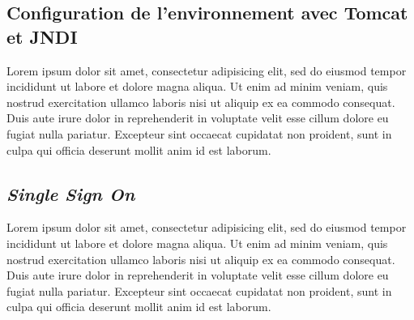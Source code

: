 \documentclass{article}
\begin{document}
\subsection{Configuration de l'environnement avec Tomcat et JNDI} %
\label{sub:deploiement_avec_tomcat}
Lorem ipsum dolor sit amet, consectetur adipisicing elit, sed do eiusmod tempor incididunt ut labore et dolore magna aliqua. Ut enim ad minim veniam, quis nostrud exercitation ullamco laboris nisi ut aliquip ex ea commodo consequat. Duis aute irure dolor in reprehenderit in voluptate velit esse cillum dolore eu fugiat nulla pariatur. Excepteur sint occaecat cupidatat non proident, sunt in culpa qui officia deserunt mollit anim id est laborum.

\subsection{\emph{Single Sign On}} %
\label{sub:single_sign_on}
Lorem ipsum dolor sit amet, consectetur adipisicing elit, sed do eiusmod tempor incididunt ut labore et dolore magna aliqua. Ut enim ad minim veniam, quis nostrud exercitation ullamco laboris nisi ut aliquip ex ea commodo consequat. Duis aute irure dolor in reprehenderit in voluptate velit esse cillum dolore eu fugiat nulla pariatur. Excepteur sint occaecat cupidatat non proident, sunt in culpa qui officia deserunt mollit anim id est laborum.

\end{document}
